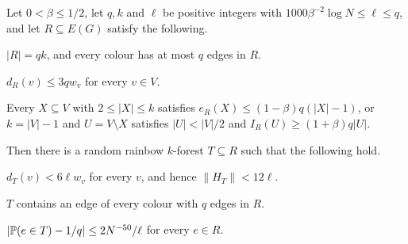 \begin{lemma}\label{lem:sample}
Let $0<\beta\le1/2$, let $q,k$ and $\ell$ be positive integers with $1000\beta^{-2}\log N\le\ell\le q$, and let $R\subseteq E(G)$ satisfy the following.
\begin{props}
\item $|R|=qk$, and every colour has at most $q$ edges in $R$.\label{S:count}
\item $d_R(v)\le3qw_v$ for every $v\in V$.\label{S:deg}
\item Every $X\subseteq V$ with $2\le|X|\le k$ satisfies $e_R(X)\le(1-\beta)q(|X|-1)$, or $k=|V|-1$ and $U=V\setminus X$ satisfies $|U|<|V|/2$ and $I_R(U)\ge(1+\beta)q|U|$.\label{S:rank}
\end{props}
Then there is a random rainbow $k$-forest $T\subseteq R$ such that the following hold.
\begin{props}
\item $d_T(v)<6\ell w_v$ for every $v$, and hence $\|H_T\|<12\ell$.\label{T:deg}
\item $T$ contains an edge of every colour with $q$ edges in $R$.\label{T:sat}
\item $|\mathbb{P}(e\in T)-1/q|\le 2N^{-50}/\ell$ for every $e\in R$.\label{T:marg}
\end{props}
\end{lemma}

